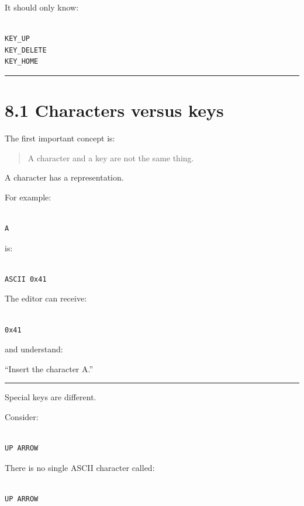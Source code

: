 \documentclass[
  oneside,
  openany]{book}
\begin{document}
It should only know:

\begin{verbatim}

KEY_UP
KEY_DELETE
KEY_HOME
\end{verbatim}

\begin{center}\rule{0.5\linewidth}{0.5pt}\end{center}

\hypertarget{characters-versus-keys}{%
\section{8.1 Characters versus keys}\label{characters-versus-keys}}

The first important concept is:

\begin{quote}
A character and a key are not the same thing.
\end{quote}

A character has a representation.

For example:

\begin{verbatim}

A
\end{verbatim}

is:

\begin{verbatim}

ASCII 0x41
\end{verbatim}

The editor can receive:

\begin{verbatim}

0x41
\end{verbatim}

and understand:

``Insert the character A.''

\begin{center}\rule{0.5\linewidth}{0.5pt}\end{center}

Special keys are different.

Consider:

\begin{verbatim}

UP ARROW
\end{verbatim}

There is no single ASCII character called:

\begin{verbatim}

UP ARROW
\end{verbatim}
\end{document}

